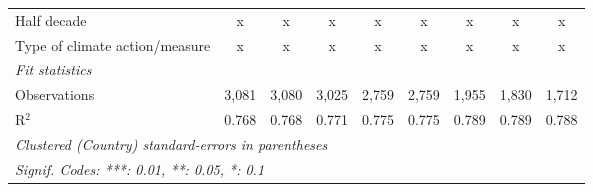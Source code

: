 \begin{tabular}{lcccccccc}
   Half decade                                                                & x             & x             & x             & x             & x             & x            & x             & x\\  
   Type of climate action/measure                                             & x             & x             & x             & x             & x             & x            & x             & x\\  
   \midrule \emph{Fit statistics}\\
   Observations                                                               & 3,081         & 3,080         & 3,025         & 2,759         & 2,759         & 1,955        & 1,830         & 1,712\\  
   R$^2$                                                                      & 0.768         & 0.768         & 0.771         & 0.775         & 0.775         & 0.789        & 0.789         & 0.788\\  
   \midrule
   \multicolumn{9}{l}{\emph{Clustered (Country) standard-errors in parentheses}}\\
   \multicolumn{9}{l}{\emph{Signif. Codes: ***: 0.01, **: 0.05, *: 0.1}}\\
\end{tabular}
\par\endgroup



